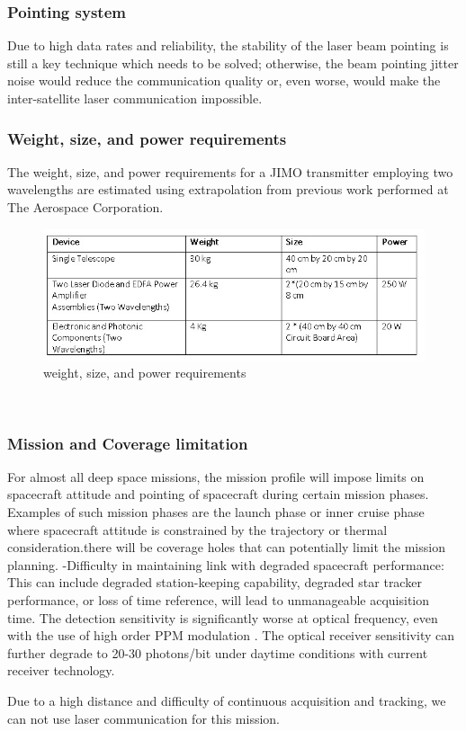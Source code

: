 \subsubsection{Pointing system}
Due to high data rates and reliability, the stability of the laser beam pointing is still a key technique which needs to be solved; otherwise, the beam pointing jitter noise would reduce the communication quality or, even worse, would make the inter-satellite laser communication impossible. 
\subsubsection{Weight, size, and power requirements}
The weight, size, and power requirements for a JIMO transmitter employing two wavelengths are estimated using extrapolation from previous work performed at The Aerospace Corporation.
\begin{figure}[htb]
\begin{center}
\includegraphics[width=1\columnwidth]{figures/laser-communication/bh11.jpg}
\caption{weight, size, and power requirements}
\end{center}
\end{figure}
\\
\subsubsection{Mission and Coverage limitation}
For almost all deep space missions, the mission profile will impose limits on spacecraft attitude and pointing of spacecraft during certain mission phases. Examples of such mission phases are the launch phase or inner cruise phase where spacecraft attitude is constrained by the trajectory or thermal consideration.there will be coverage holes that can potentially limit the mission planning.
-Difficulty in maintaining link with degraded spacecraft performance: This can include degraded station-keeping capability, degraded star tracker performance, or loss of time reference, will lead to unmanageable acquisition time.
The detection sensitivity is significantly worse at optical frequency, even with the use of high order PPM modulation . The optical receiver sensitivity can further degrade to 20-30 photons/bit under daytime conditions with current receiver technology.

Due to a high distance and difficulty of continuous acquisition and tracking, we can not use laser communication for this mission.
